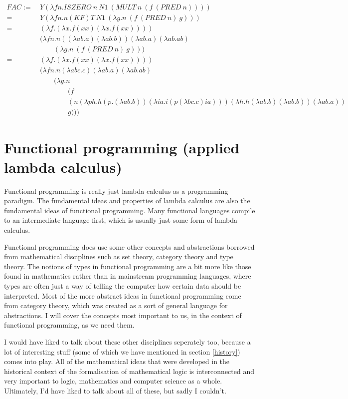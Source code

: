 \documentclass[11pt]{article}
\begin{document}
\begin{align*}
	FAC :=\ &Y(\lambda fn.ISZERO\ n\ N1\ (MULT\ n\ (f\ (PRED\ n))))\\
	=\ &Y(\lambda fn.n(KF)T\ N1\ (\lambda g.n\ (f\ (PRED\ n)\ g)))\\
	=\ &(\lambda f.(\lambda x.f(xx)(\lambda x.f(xx))))\\
	&(\lambda fn.n((\lambda ab.a)(\lambda ab.b))(\lambda ab.a)(\lambda ab.ab)\\
	&\qquad(\lambda g.n\ (f\ (PRED\ n)\ g)))\\
	=\ &(\lambda f.(\lambda x.f(xx)(\lambda x.f(xx))))\\
	&(\lambda fn.n(\lambda abc.c)(\lambda ab.a)(\lambda ab.ab)\\
	&\qquad(\lambda g.n\\
	&\qquad\qquad(f\\
	&\qquad\qquad(n(\lambda ph.h(p.(\lambda ab.b))(\lambda ia.i(p(\lambda bc.c)ia)))(\lambda h.h(\lambda ab.b)(\lambda ab.b))(\lambda ab.a))\\
	&\qquad\qquad g)))
\end{align*}

\section{Functional programming (applied lambda calculus)}\label{functional_programming}

Functional programming is really just lambda calculus as a programming
paradigm. The fundamental ideas and properties of lambda calculus are also the
fundamental ideas of functional programming. Many functional languages compile
to an intermediate language first, which is usually just some form of lambda
calculus.

Functional programming does use some other concepts and abstractions borrowed
from mathematical disciplines such as set theory, category theory and type
theory. The notions of types in functional programming are a bit more like
those found in mathematics rather than in mainstream programming languages,
where types are often just a way of telling the computer how certain data
should be interpreted. Most of the more abstract ideas in functional
programming come from category theory, which was created as a sort of general
language for abstractions. I will cover the concepts most important to us, in
the context of functional programming, as we need them.

I would have liked to talk about these other disciplines seperately too,
because a lot of interesting stuff (some of which we have mentioned in section
\ref{history}) comes into play. All of the mathematical ideas that were
developed in the historical context of the formalisation of mathematical logic
is interconnected and very important to logic, mathematics and computer science
as a whole. Ultimately, I'd have liked to talk about all of these, but sadly I
couldn't.
\end{document}
